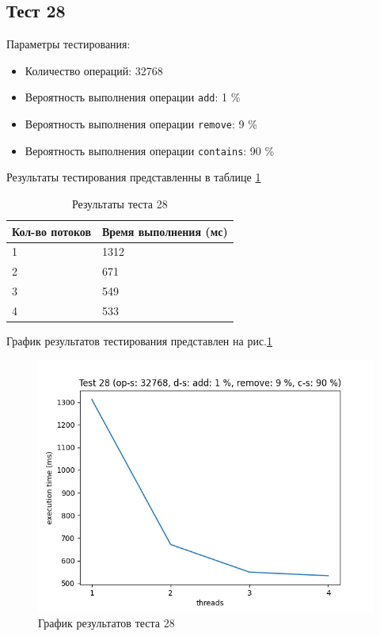 \subsection*{Тест 28}

Параметры тестирования:

\begin{itemize}
    \item Количество операций: 32768
    \item Вероятность выполнения операции \verb|add|: 1 \%
    \item Вероятность выполнения операции \verb|remove|: 9 \%
    \item Вероятность выполнения операции \verb|contains|: 90 \%
\end{itemize}

Результаты тестирования представленны в таблице \ref{tab:results28}


\begin{table}[H]
    \centering
    \begin{tabular}{|l|l|}
        \hline
        Кол-во потоков & Время выполнения (мс) \\
        \hline
        1 & 1312 \\
        \hline
        2 & 671 \\
        \hline
        3 & 549 \\
        \hline
        4 & 533 \\
        \hline
    \end{tabular}
    \caption{Результаты теста 28}
    \label{tab:results28}
\end{table}
        

График результатов тестирования представлен на рис.\ref{fig:plot28}

\begin{figure}[H]
    \centering
    \includegraphics[width=0.7\linewidth]{photo/plot28}
    \caption{График результатов теста 28}
    \label{fig:plot28}
\end{figure}


